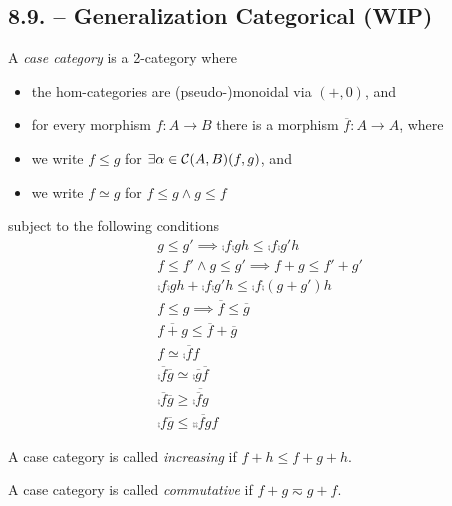 \documentclass[runningheads,envcountsame]{llncs}
\begin{document}
\subsection{8.9. -- Generalization Categorical (WIP)}

\begin{definition}
    A \emph{case category} is a 2-category where 
    \begin{itemize}
        \item the hom-categories are (pseudo-)monoidal via $(+, 0)$, and
        \item for every morphism $f\colon A \to B$ there is a morphism $\overline{f}: A \to A$, where
        \item we write $f \leq g$ for $\exists \alpha \in \mathcal{C}(A, B)(f, g)$, and
        \item we write $f \simeq g$ for $f \leq g \wedge g \leq f$
    \end{itemize}
    subject to the following conditions
    \begin{gather}
        g \leq g' \implies \comp{f}{\comp{g}{h}} \leq \comp{f}{\comp{g'}{h}} \label{equ:monotone} \\
        f \leq f' \wedge g \leq g' \implies f + g \leq f' + g' \label{equ:plus-monotone} \\
        \comp{f}{\comp{g}{h}} + \comp{f}{\comp{g'}{h}} \leq \comp{f}{\comp{(g + g')}{h}} \label{equ:superadditive} \\
        f \leq g \implies \overline{f} \leq \overline{g} \\
        \overline{f + g} \leq \overline{f} + \overline{g} \label{equ:restriction-superadditive} \\
        f \simeq \comp{\overline{f}}{f} \\
        \comp{\overline{f}}{\overline{g}} \simeq \comp{\overline{g}}{\overline{f}} \\
        \comp{\overline{f}}{\overline{g}} \geq \overline{\comp{\overline{f}}{g}} \label{equ:restriction-comp} \\
        \comp{f}{\overline{g}} \leq \comp{\overline{\comp{f}{g}}}{f} \label{equ:restriction-swap}
    \end{gather}
    
    A case category is called \emph{increasing} if $f + h \leq f + g + h$.
    
    A case category is called \emph{commutative} if $f + g \eqsim g + f$.
\end{definition}
\end{document}

